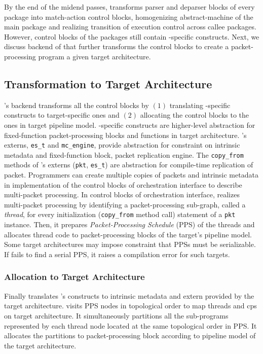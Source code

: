 \documentclass[letterpaper,twocolumn,10pt]{article}
\begin{document}
By the end of the midend passes, \ucomp transforms parser and deparser blocks of every package into match-action control blocks, homogenizing abstract-machine of the main package and realizing transition of execution control across callee packages.
However, control blocks of the packages still contain \uarch-specific constructs.
Next, we discuss backend of \ucomp that further transforms the control blocks to create a packet-processing program a given target architecture.


\subsection{Transformation to Target Architecture}
\ucomp's backend transforms all the control blocks by $(1)$ translating \uarch-specific constructs to target-specific ones and $(2)$ allocating the control blocks to the ones in target pipeline model.
\uarch-specific constructs are higher-level abstraction for fixed-function packet-processing blocks and functions in target architecture.
\uarch's externs, \texttt{es\_t} and \texttt{mc\_engine}, provide abstraction for constraint on intrinsic metadata and fixed-function block, packet replication engine.
The \texttt{copy\_from} methods of \uarch's externs (\texttt{pkt}, \texttt{es\_t}) are abstraction for compile-time replication of packet.
Programmers can create multiple copies of packets and intrinsic metadata in implementation of the control blocks of orchestration interface to describe multi-packet processing.
In control blocks of orchestration interface, \ucomp realizes multi-packet processing by identifying a packet-processing sub-graph, called a \emph{thread}, for every initialization (\texttt{copy\_from} method call) statement of a \texttt{pkt} instance.
Then, it prepares \emph{Packet-Processing Schedule} (PPS) of the threads and allocates thread code to packet-processing blocks of the target's pipeline model.
Some target architectures may impose constraint that PPSs must be serializable.
If \ucomp fails to find a serial PPS, it raises a compilation error for such targets. 





\subsubsection{Allocation to Target Architecture}
\label{subsubsection:allocation-to-target-architecture}
Finally \ucomp translates \uarch's constructs to intrinsic metadata and extern provided by the target architecture.
\ucomp visits PPS nodes in topological order to map threads and cps on target architecture.
It simultaneously partitions all the sub-programs represented by each thread node located at the same topological order in PPS.
It allocates the partitions to packet-processing block according to pipeline model of the target architecture.
\end{document}
